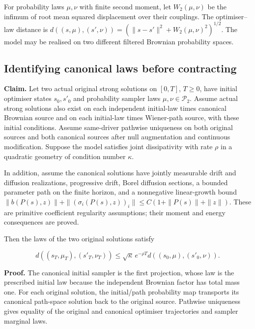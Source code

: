 \documentclass[11pt,a4paper]{report}
\begin{document}
For probability laws \(\mu,\nu\) with finite second moment, let \(W_2(\mu,\nu)\) be the infimum of root mean squared displacement over their couplings. The optimiser–law distance is \(d((s,\mu),(s',\nu))=(\|s-s'\|^2+W_2(\mu,\nu)^2)^{1/2}\). The model may be realised on two different filtered Brownian probability spaces.

\subsection{\texorpdfstring{Identifying canonical laws before contracting}{Identifying canonical laws before contracting}}


\textbf{Claim.} Let two actual original strong solutions on \([0,T]\), \(T\ge0\), have initial optimiser states \(s_0,s'_0\) and probability sampler laws \(\mu,\nu\in\mathcal P_2\). Assume actual strong solutions also exist on each independent initial-law times canonical Brownian source and on each initial-law times Wiener-path source, with these initial conditions. Assume same-driver pathwise uniqueness on both original sources and both canonical sources after null augmentation and continuous modification. Suppose the model satisfies joint dissipativity with rate \(\rho\) in a quadratic geometry of condition number \(\kappa\).



In addition, assume the canonical solutions have jointly measurable drift and diffusion realizations, progressive drift, Borel diffusion sections, a bounded parameter path on the finite horizon, and a nonnegative linear-growth bound \(\|b(P(s),z)\|+\|(\sigma_i(P(s),z))_i\|\le C(1+\|P(s)\|+\|z\|)\). These are primitive coefficient regularity assumptions; their moment and energy consequences are proved.



Then the laws of the two original solutions satisfy

\[d((s_T,\mu_T),(s'_T,\nu_T))\le\sqrt\kappa\,e^{-\rho T}d((s_0,\mu),(s'_0,\nu)).\]

\textbf{Proof.} The canonical initial sampler is the first projection, whose law is the prescribed initial law because the independent Brownian factor has total mass one. For each original solution, the initial/\allowbreak{}path probability map transports its canonical path-space solution back to the original source. Pathwise uniqueness gives equality of the original and canonical optimiser trajectories and sampler marginal laws.
\end{document}
